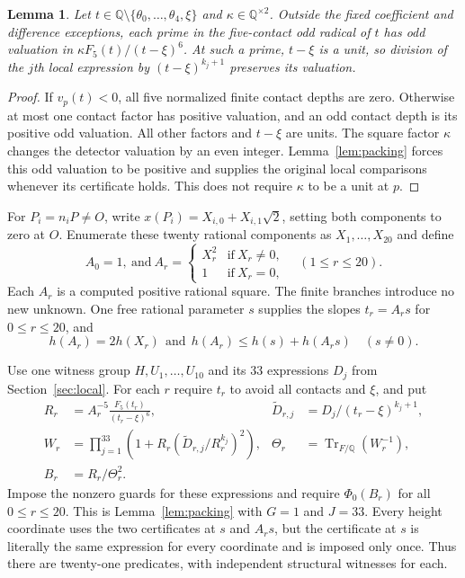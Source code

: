 \documentclass[11pt,reqno]{amsart}
\newtheorem{lemma}[theorem]{Lemma}
\theoremstyle{definition}
\numberwithin{equation}{section}
\newcommand{\Q}{\mathbb Q}
\newcommand{\Tr}{\operatorname{Tr}}
\def\t{\text}
\begin{document}
\begin{lemma}\label{lem:parity}
Let $t\in\Q\setminus\{\theta_0,\ldots,\theta_4,\xi\}$ and $\kappa\in\Q^{\times2}$. Outside the fixed coefficient and difference exceptions, each prime in the five-contact odd radical of $t$ has odd valuation in $\kappa F_5(t)/(t-\xi)^6$. At such a prime, $t-\xi$ is a unit, so division of the $j$th local expression by $(t-\xi)^{k_j+1}$ preserves its valuation.
\end{lemma}
\begin{proof}
If $v_p(t)<0$, all five normalized finite contact depths are zero. Otherwise at most one contact factor has positive valuation, and an odd contact depth is its positive odd valuation. All other factors and $t-\xi$ are units. The square factor $\kappa$ changes the detector valuation by an even integer. Lemma~\ref{lem:packing} forces this odd valuation to be positive and supplies the original local comparisons whenever its certificate holds. This does not require $\kappa$ to be a unit at $p$.
\end{proof}

For $P_i=n_iP\ne O$, write $x(P_i)=X_{i,0}+X_{i,1}\sqrt2$, setting both components to zero at $O$. Enumerate these twenty rational components as $X_1,\ldots,X_{20}$ and define
\begin{equation}\label{eq:squareheight}
 A_0=1,\ \t{and}\  A_r=\begin{cases}X_r^2&\t{if}\ X_r\ne0,\\1&\t{if}\ X_r=0,\end{cases}
 \quad(1\le r\le20).
\end{equation}
Each $A_r$ is a computed positive rational square. The finite branches introduce no new unknown. One free rational parameter $s$ supplies the slopes $t_r=A_rs$ for $0\le r\le20$, and
\begin{equation}\label{eq:heightpair}
 h(A_r)=2h(X_r)\ \ \t{and}\ \  h(A_r)\le h(s)+h(A_rs)\quad(s\ne0).
\end{equation}

Use one witness group $H,U_1,\ldots,U_{10}$ and its 33 expressions $D_j$ from Section~\ref{sec:local}. For each $r$ require $t_r$ to avoid all contacts and $\xi$, and put
\begin{align}
 R_r&=A_r^{-5}\frac{F_5(t_r)}{(t_r-\xi)^6},
 &\widetilde D_{r,j}&=D_j/(t_r-\xi)^{k_j+1},\label{eq:commondata}\\
 W_r&=\prod_{j=1}^{33}\left(1+R_r(\widetilde D_{r,j}/R_r^{k_j})^2\right),
 &\Theta_r&=\Tr_{F/\Q}(W_r^{-1}),\label{eq:commonpacking}\\
 B_r&=R_r/\Theta_r^2.&&\label{eq:commonB}
\end{align}
Impose the nonzero guards for these expressions and require $\Phi_0(B_r)$ for all $0\le r\le20$. This is Lemma~\ref{lem:packing} with $G=1$ and $J=33$. Every height coordinate uses the two certificates at $s$ and $A_rs$, but the certificate at $s$ is literally the same expression for every coordinate and is imposed only once. Thus there are twenty-one predicates, with independent structural witnesses for each.
\end{document}
